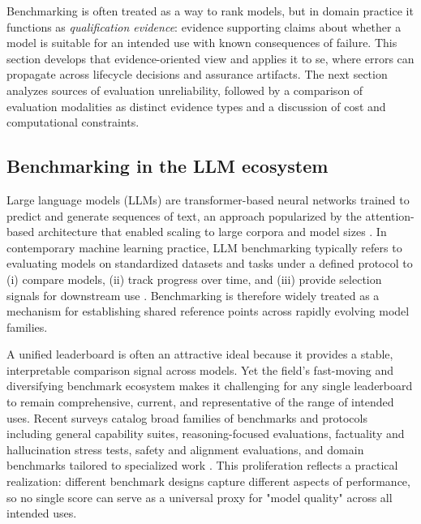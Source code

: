 Benchmarking is often treated as a way to rank models, but in domain practice it functions as \emph{qualification evidence}: evidence supporting claims about whether a model is suitable for an intended use with known consequences of failure. This section develops that evidence-oriented view and applies it to \ac{se}, where errors can propagate across lifecycle decisions and assurance artifacts. The next section analyzes sources of evaluation unreliability, followed by a comparison of evaluation modalities as distinct evidence types and a discussion of cost and computational constraints.


\subsection{Benchmarking in the LLM ecosystem}
\label{subsec:benchmarking_llm_ecosystem}

Large language models (LLMs) are transformer-based neural networks trained to predict and generate sequences of text, an approach popularized by the attention-based architecture that enabled scaling to large corpora and model sizes \cite{vaswani_AttentionAllYou_2017}. In contemporary machine learning practice, LLM benchmarking typically refers to evaluating models on standardized datasets and tasks under a defined protocol to (i) compare models, (ii) track progress over time, and (iii) provide selection signals for downstream use \cite{huggingfaceOpenLLMLeaderboard2024, myrzakhan_OpenLLMLeaderboard_2024}. Benchmarking is therefore widely treated as a mechanism for establishing shared reference points across rapidly evolving model families.

A unified leaderboard is often an attractive ideal because it provides a stable, interpretable comparison signal across models. Yet the field’s fast-moving and diversifying benchmark ecosystem makes it challenging for any single leaderboard to remain comprehensive, current, and representative of the range of intended uses. Recent surveys catalog broad families of benchmarks and protocols including general capability suites, reasoning-focused evaluations, factuality and hallucination stress tests, safety and alignment evaluations, and domain benchmarks tailored to specialized work \cite{chang_SurveyEvaluationLarge_2024, ni_SurveyLargeLanguageBenchmarks_2025}. This proliferation reflects a practical realization: different benchmark designs capture different aspects of performance, so no single score can serve as a universal proxy for "model quality" across all intended uses.

